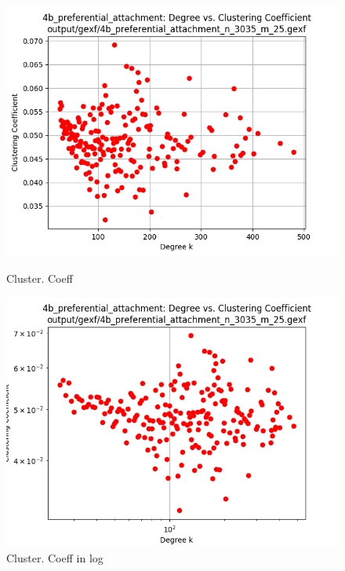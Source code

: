 \documentclass[runningheads]{llncs}
\begin{document}
\begin{figure}
    \centering
    \begin{minipage}{0.5\textwidth}
        \centering
        \includegraphics[width=\textwidth]{4b_preferential_attachment_clustering_coeff}
        \caption{Cluster. Coeff}
        \label{fig_4b_sw_clustering_coeff}
    \end{minipage}\hfill
    \begin{minipage}{0.5\textwidth}
        \centering
        \includegraphics[width=\textwidth]{4b_preferential_attachment_clustering_coeff_log}
        \caption{ Cluster. Coeff in log}
        \label{fig_4b_sw_clustering_coeff_log}
    \end{minipage}
\end{figure}
\end{document}
